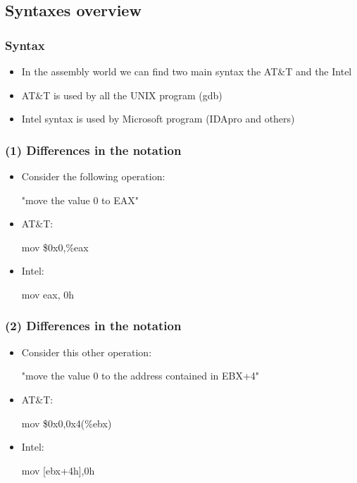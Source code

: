 \documentclass[]{beamer}
\begin{document}
	\subsection{Syntaxes overview}
		\begin{frame}
			\frametitle{Syntax}
			\begin{itemize}
				\item{In the assembly world we can find two main syntax the AT\&T and the Intel}
				\item{AT\&T is used by all the UNIX program (gdb)}
				\item{Intel syntax is used by Microsoft program (IDApro and others)}
			\end{itemize}
		\end{frame}
		\begin{frame}
			\frametitle{(1) Differences in the notation}
			\begin{itemize}
				\item{Consider the following operation:\newline\centerline{"move the value 0 to EAX"}}
				\item{AT\&T: \centerline{ mov \$0x0,\%eax} }
				\item{Intel: \centerline{ mov eax, 0h}}
			\end{itemize}
		\end{frame}
		\begin{frame}
			\frametitle{(2) Differences in the notation}
			\begin{itemize}
				\item{Consider this other operation:\newline\centerline {"move the value 0 to the address contained in EBX+4"}}
				\item{AT\&T: \centerline{ mov \$0x0,0x4(\%ebx)}}
				\item{Intel: \centerline{ mov [ebx+4h],0h }}
			\end{itemize}
		\end{frame}
\end{document}
